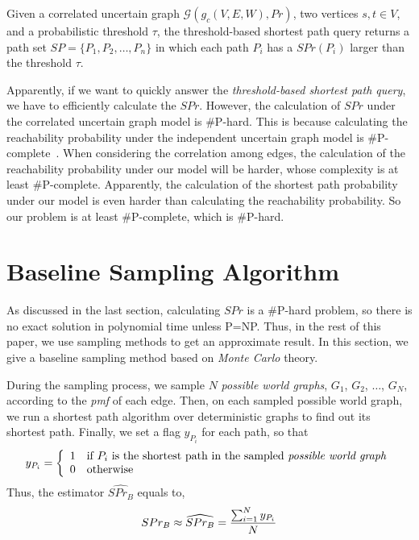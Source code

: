 \documentclass[runningheads,a4paper]{llncs}
\begin{document}
\vspace{-0.3cm}
\begin{definition}
  \label{def:ProThre}
Given a correlated uncertain graph $\mathcal{G}(g_c(V,E,W),Pr)$, two vertices $s,t\in V$, and a probabilistic threshold $\tau$, the threshold-based shortest path query returns a path set $SP=\{P_1,P_2,\ldots,P_n\}$ in which each path $P_i$ has a $SPr(P_i)$ larger than the threshold $\tau$.
\vspace{-0.3cm}
\end{definition}

Apparently, if we want to quickly answer the \emph{threshold-based shortest path query}, we have to efficiently calculate the $SPr$. However, the calculation of $SPr$ under the correlated uncertain graph model is \#P-hard. This is because calculating the reachability probability under the independent uncertain graph model is \#P-complete~\cite{jin2011distance}\cite{valiant1979complexity}. When considering the correlation among edges, the calculation of the reachability probability under our model will be harder, whose complexity is at least \#P-complete. Apparently, the calculation of the shortest path probability under our model is even harder than calculating the reachability probability. So our problem is at least \#P-complete, which is \#P-hard.

\vspace{-0.3cm}
\section{Baseline Sampling Algorithm}
\label{sec:base}
\vspace{-0.3cm}

As discussed in the last section, calculating $SPr$ is a \#P-hard problem, so there is no exact solution in polynomial time unless P=NP. Thus, in the rest of this paper, we use sampling methods to get an approximate result. In this section, we give a baseline sampling method based on \emph{Monte Carlo} theory.

During the sampling process, we sample $N$ \emph{possible world graphs}, $G_1$, $G_2$, $\dots$, $G_N$, according to the \emph{pmf} of each edge. Then, on each sampled possible world graph, we run a shortest path algorithm over deterministic graphs to find out its shortest path. Finally, we set a flag $y_{P_i}$ for each path, so that
\vspace{-0.2cm}
\[
y_{P_i}=\left\{ \begin{array}{ll}
1 & \textrm{if $P_i$ is the shortest path in the sampled \emph{possible world graph}}\\
0 & \textrm{otherwise}
\end{array} \right.
\vspace{-0.2cm}
\]
Thus, the estimator $\widehat{SPr_B}$ equals to,
\vspace{-0.2cm}
\begin{equation}
\label{eq:SPrB}
  SPr_B\approx\widehat{SPr_B}=\frac{\sum_{i=1}^Ny_{P_i}}{N}
\vspace{-0.2cm}
\end{equation}
\end{document}
